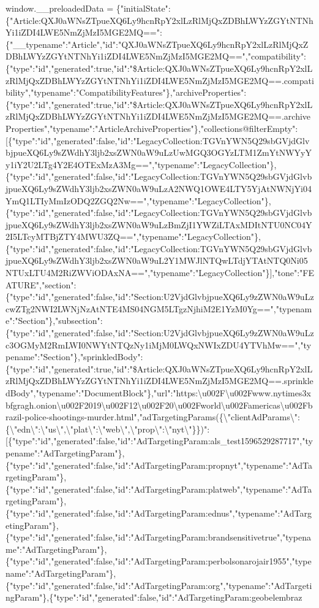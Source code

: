 window.\_\_preloadedData =
\{"initialState":\{"Article:QXJ0aWNsZTpueXQ6Ly9hcnRpY2xlLzRlMjQxZDBhLWYzZGYtNTNhYi1iZDI4LWE5NmZjMzI5MGE2MQ==":\{"\_\_typename":"Article","id":"QXJ0aWNsZTpueXQ6Ly9hcnRpY2xlLzRlMjQxZDBhLWYzZGYtNTNhYi1iZDI4LWE5NmZjMzI5MGE2MQ==","compatibility":\{"type":"id","generated":true,"id":"\$Article:QXJ0aWNsZTpueXQ6Ly9hcnRpY2xlLzRlMjQxZDBhLWYzZGYtNTNhYi1iZDI4LWE5NmZjMzI5MGE2MQ==.compatibility","typename":"CompatibilityFeatures"\},"archiveProperties":\{"type":"id","generated":true,"id":"\$Article:QXJ0aWNsZTpueXQ6Ly9hcnRpY2xlLzRlMjQxZDBhLWYzZGYtNTNhYi1iZDI4LWE5NmZjMzI5MGE2MQ==.archiveProperties","typename":"ArticleArchiveProperties"\},"collections@filterEmpty":{[}\{"type":"id","generated":false,"id":"LegacyCollection:TGVnYWN5Q29sbGVjdGlvbjpueXQ6Ly9sZWdhY3ljb2xsZWN0aW9uLzUwMGQ3OGYzLTM1ZmYtNWYyYy1iY2U2LTg4Y2E4OTExMzA3Mg==","typename":"LegacyCollection"\},\{"type":"id","generated":false,"id":"LegacyCollection:TGVnYWN5Q29sbGVjdGlvbjpueXQ6Ly9sZWdhY3ljb2xsZWN0aW9uLzA2NWQ1OWE4LTY5YjAtNWNjYi04YmQ1LTIyMmIzODQ2ZGQ2Nw==","typename":"LegacyCollection"\},\{"type":"id","generated":false,"id":"LegacyCollection:TGVnYWN5Q29sbGVjdGlvbjpueXQ6Ly9sZWdhY3ljb2xsZWN0aW9uLzBmZjI1YWZiLTAxMDItNTU0NC04Y2I5LTcyMTBjZTY4MWU3ZQ==","typename":"LegacyCollection"\},\{"type":"id","generated":false,"id":"LegacyCollection:TGVnYWN5Q29sbGVjdGlvbjpueXQ6Ly9sZWdhY3ljb2xsZWN0aW9uL2Y1MWJlNTQwLTdjYTAtNTQ0Ni05NTUxLTU4M2RiZWViODAxNA==","typename":"LegacyCollection"\}{]},"tone":"FEATURE","section":\{"type":"id","generated":false,"id":"Section:U2VjdGlvbjpueXQ6Ly9zZWN0aW9uLzcwZTg2NWI2LWNjNzAtNTE4MS04NGM5LTgzNjhiM2E1YzM0Yg==","typename":"Section"\},"subsection":\{"type":"id","generated":false,"id":"Section:U2VjdGlvbjpueXQ6Ly9zZWN0aW9uLzc3OGMyM2RmLWI0NWYtNTQzNy1iMjM0LWQxNWIxZDU4YTVhMw==","typename":"Section"\},"sprinkledBody":\{"type":"id","generated":true,"id":"\$Article:QXJ0aWNsZTpueXQ6Ly9hcnRpY2xlLzRlMjQxZDBhLWYzZGYtNTNhYi1iZDI4LWE5NmZjMzI5MGE2MQ==.sprinkledBody","typename":"DocumentBlock"\},"url":"https:\textbackslash{}u002F\textbackslash{}u002Fwww.nytimes3xbfgragh.onion\textbackslash{}u002F2019\textbackslash{}u002F12\textbackslash{}u002F20\textbackslash{}u002Fworld\textbackslash{}u002Famericas\textbackslash{}u002Fbrazil-police-shootings-murder.html","adTargetingParams(\{\textbackslash{}"clientAdParams\textbackslash{}":\{\textbackslash{}"edn\textbackslash{}":\textbackslash{}"us\textbackslash{}",\textbackslash{}"plat\textbackslash{}":\textbackslash{}"web\textbackslash{}",\textbackslash{}"prop\textbackslash{}":\textbackslash{}"nyt\textbackslash{}"\}\})":{[}\{"type":"id","generated":false,"id":"AdTargetingParam:als\_test1596529287717","typename":"AdTargetingParam"\},\{"type":"id","generated":false,"id":"AdTargetingParam:propnyt","typename":"AdTargetingParam"\},\{"type":"id","generated":false,"id":"AdTargetingParam:platweb","typename":"AdTargetingParam"\},\{"type":"id","generated":false,"id":"AdTargetingParam:ednus","typename":"AdTargetingParam"\},\{"type":"id","generated":false,"id":"AdTargetingParam:brandsensitivetrue","typename":"AdTargetingParam"\},\{"type":"id","generated":false,"id":"AdTargetingParam:perbolsonarojair1955","typename":"AdTargetingParam"\},\{"type":"id","generated":false,"id":"AdTargetingParam:org","typename":"AdTargetingParam"\},\{"type":"id","generated":false,"id":"AdTargetingParam:geobelembraz